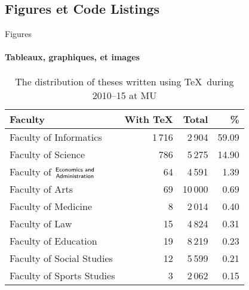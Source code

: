 \documentclass{beamer}
\begin{document}
\subsection{Figures et Code Listings}
\begin{frame}[label=figs1]{Figures}
\framesubtitle{Tableaux, graphiques, et images}
\begin{table}[!b]
{\carlitoTLF %
\begin{tabularx}{\textwidth}{Xrrr}
    \textbf{Faculty} & \textbf{With \TeX} & \textbf{Total} &
    \textbf{\%} \\
    \toprule
    Faculty of Informatics       & 1\,716  & 2\,904  &
    59.09 \\%
    Faculty of Science           & 786     & 5\,275  &
    14.90 \\%
    Faculty of $\genfrac{}{}{0pt}{}{\textsf{Economics and}}{%
    \textsf{Administration}}$    & 64      & 4\,591  &
    1.39  \\%
    Faculty of Arts              & 69      & 10\,000 &
    0.69  \\%
    Faculty of Medicine          & 8       & 2\,014  &
    0.40  \\%
    Faculty of Law               & 15      & 4\,824  &
    0.31  \\%
    Faculty of Education         & 19      & 8\,219  &
    0.23  \\%
    Faculty of Social Studies    & 12      & 5\,599  &
    0.21  \\%
    Faculty of Sports Studies    & 3       & 2\,062  &
    0.15  \\%
    \bottomrule
\end{tabularx}}
\caption{The distribution of theses written using \TeX\ during 2010--15 at MU}
\end{table}
\end{frame}
\end{document}
